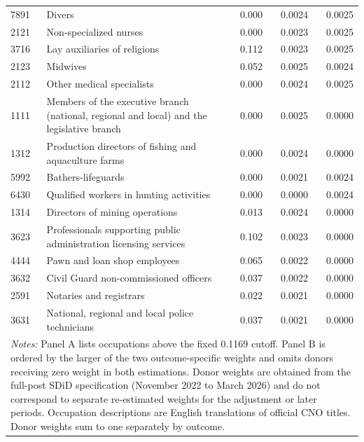 \begin{longtable}{p{}>{\raggedright\arraybackslash}p{}rrr}
7891 & Divers & 0.000 & 0.0024 & 0.0025 \\
2121 & Non-specialized nurses & 0.000 & 0.0023 & 0.0025 \\
3716 & Lay auxiliaries of religions & 0.112 & 0.0023 & 0.0025 \\
2123 & Midwives & 0.052 & 0.0025 & 0.0024 \\
2112 & Other medical specialists & 0.000 & 0.0024 & 0.0025 \\
1111 & Members of the executive branch (national, regional and local) and the legislative branch & 0.000 & 0.0025 & 0.0000 \\
1312 & Production directors of fishing and aquaculture farms & 0.000 & 0.0024 & 0.0000 \\
5992 & Bathers-lifeguards & 0.000 & 0.0021 & 0.0024 \\
6430 & Qualified workers in hunting activities & 0.000 & 0.0000 & 0.0024 \\
1314 & Directors of mining operations & 0.013 & 0.0024 & 0.0000 \\
3623 & Professionals supporting public administration licensing services & 0.102 & 0.0023 & 0.0000 \\
4444 & Pawn and loan shop employees & 0.065 & 0.0022 & 0.0000 \\
3632 & Civil Guard non-commissioned officers & 0.037 & 0.0022 & 0.0000 \\
2591 & Notaries and registrars & 0.022 & 0.0021 & 0.0000 \\
3631 & National, regional and local police technicians & 0.037 & 0.0021 & 0.0000 \\
\midrule
\multicolumn{5}{p{0.93\textwidth}}{\footnotesize \emph{Notes:} Panel A lists occupations above the fixed 0.1169 cutoff. Panel B is ordered by the larger of the two outcome-specific weights and omits donors receiving zero weight in both estimations. Donor weights are obtained from the full-post SDiD specification (November 2022 to March 2026) and do not correspond to separate re-estimated weights for the adjustment or later periods. Occupation descriptions are English translations of official CNO titles. Donor weights sum to one separately by outcome.} \\
\bottomrule
\end{longtable}
\normalsize
\endgroup
